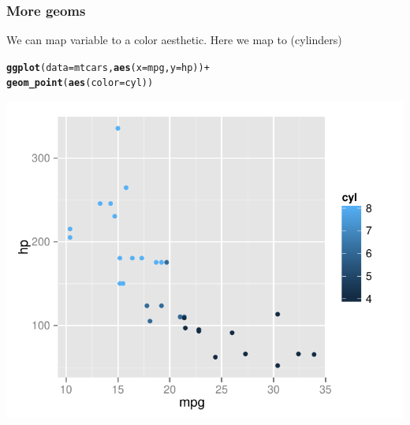 \documentclass[12pt]{beamer}\usepackage[]{graphicx}\usepackage[]{color}
\makeatletter
\newcommand{\hlopt}[1]{\textcolor[rgb]{0,0,0}{#1}}%
\newcommand{\hlstd}[1]{\textcolor[rgb]{0.345,0.345,0.345}{#1}}%
\newcommand{\hlkwc}[1]{\textcolor[rgb]{0.333,0.667,0.333}{#1}}%
\newcommand{\hlkwd}[1]{\textcolor[rgb]{0.737,0.353,0.396}{\textbf{#1}}}%
\newenvironment{kframe}{%
 \def\at@end@of@kframe{}%
 \ifinner\ifhmode%
  \def\at@end@of@kframe{\end{minipage}}%
  \begin{minipage}{\columnwidth}%
 \fi\fi%
 \def\FrameCommand##1{\hskip\@totalleftmargin \hskip-\fboxsep
 \colorbox{shadecolor}{##1}\hskip-\fboxsep
     \hskip-\linewidth \hskip-\@totalleftmargin \hskip\columnwidth}%
 \MakeFramed {\advance\hsize-\width
   \@totalleftmargin\z@ \linewidth\hsize
   \@setminipage}}%
 {\par\unskip\endMakeFramed%
 \at@end@of@kframe}
\newenvironment{knitrout}{}{} %
\makeatother
\begin{document}
\begin{frame}[fragile]
\frametitle{More geoms}
We can map variable to a color aesthetic. Here we map  to  (cylinders)
\begin{knitrout}\scriptsize
{}\color{fgcolor}\begin{kframe}
\begin{alltt}
\hlkwd{ggplot}\hlstd{(}\hlkwc{data} \hlstd{= mtcars,} \hlkwd{aes}\hlstd{(}\hlkwc{x} \hlstd{= mpg,} \hlkwc{y} \hlstd{= hp))} \hlopt{+}
  \hlkwd{geom_point}\hlstd{(}\hlkwd{aes}\hlstd{(}\hlkwc{color} \hlstd{= cyl))}
\end{alltt}
\end{kframe}

{\centering \includegraphics[width=.6\linewidth,height=.5\linewidth]{figure/xyplot_mtcars11-1} 

}



\end{knitrout}

\end{frame}

\end{document}
